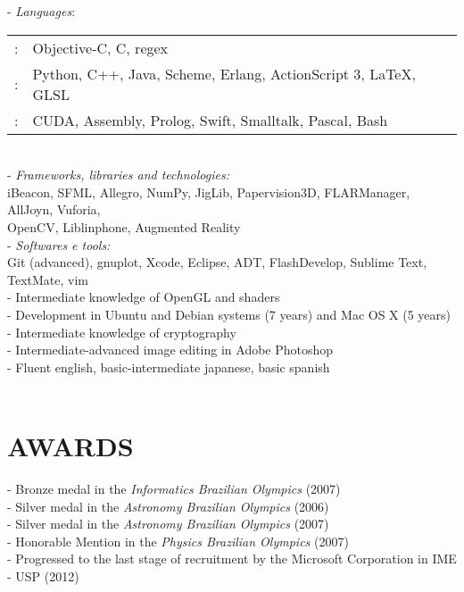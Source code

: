 \documentclass[]{res} %
\def \divspace{6pt}
\begin{document}
\begin{resume}
- {\sl Languages}: \\
\setlength\tabcolsep{2pt}
\begin{tabular}{l l}
\hspace*{1.5em}{\it Fluent}:& Objective-C, C, regex \\
\hspace*{1.5em}{\it More Familiar}:& Python, C++, Java, Scheme, Erlang, ActionScript 3, \LaTeX, GLSL \\
\hspace*{1.5em}{\it Less Familiar}:& CUDA, Assembly, Prolog, Swift, Smalltalk, Pascal, Bash \\
\end{tabular}
\\
- {\sl Frameworks, libraries and technologies:} \\
\hspace*{1.5em}iBeacon, SFML, Allegro, NumPy, JigLib, Papervision3D, FLARManager, AllJoyn, Vuforia, \\
\hspace*{1.5em}OpenCV, Liblinphone, Augmented Reality
\\
- {\sl Softwares e tools:} \\
\hspace*{1.5em}Git (advanced), gnuplot, Xcode, Eclipse, ADT, FlashDevelop, Sublime Text, TextMate, vim
\\
- Intermediate knowledge of OpenGL and shaders \\
- Development in Ubuntu and Debian systems (7 years) and Mac OS X (5 years) \\
- Intermediate knowledge of cryptography \\
- Intermediate-advanced image editing in Adobe Photoshop \\
- Fluent english, basic-intermediate japanese, basic spanish\\\\


\section{AWARDS \hspace{\divspace} }

- Bronze medal in the {\sl Informatics Brazilian Olympics} (2007) \\
- Silver medal in the {\sl Astronomy Brazilian Olympics} (2006) \\
- Silver medal in the {\sl Astronomy Brazilian Olympics} (2007) \\
- Honorable Mention in the {\sl Physics Brazilian Olympics} (2007) \\
- Progressed to the last stage of recruitment by the Microsoft Corporation in IME - USP (2012)


\end{resume}
\end{document}

